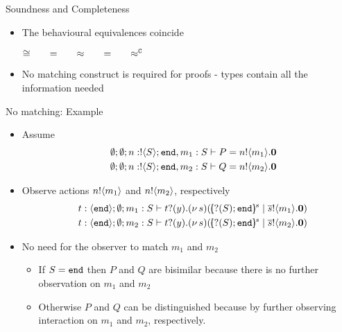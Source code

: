 \documentclass{beamer}
\begin{document}
	\begin{frame}{Soundness and Completeness}
		\begin{itemize}
			\item	The behavioural equivalences coincide

				\begin{theorem}
					\begin{center}
					$\cong \qquad =\qquad \approx \qquad =\qquad \approx^\mathtt{C}$
					\end{center}
				\end{theorem}

			\item	No matching construct is required for proofs - types contain all the information needed

		\end{itemize}
	\end{frame}

	\begin{frame}{No matching: Example}
			\begin{itemize}
				\item	Assume
					\begin{eqnarray*}
						&&\emptyset; \emptyset; n: ! \langle S \rangle ; \mathtt{end}, m_1 : S \vdash P = n ! \langle m_1 \rangle . \mathbf{0} \\
						&&\emptyset; \emptyset; n: ! \langle S \rangle ; \mathtt{end}, m_2 : S \vdash Q = n ! \langle m_2 \rangle . \mathbf{0}
					\end{eqnarray*}
				\item	Observe actions $n ! \langle m_1 \rangle$ and $n ! \langle m_2 \rangle$, respectively
					\begin{eqnarray*}
						&& t: \chtype{\tinact}; \es; m_1 : S \proves \binp{t}{y} \newsp{s}{\mapchar{\btinp{S} \tinact}{s}\Par \bout{\dual{s}}{m_1}\inact} \\
						&& t: \chtype{\tinact}; \es; m_2 : S \proves \binp{t}{y} \newsp{s}{\mapchar{\btinp{S} \tinact}{s}\Par \bout{\dual{s}}{m_2}\inact} 
					\end{eqnarray*}


				\item	No need for the observer to match $m_1$ and $m_2$
				\begin{itemize}
					\item	If $S = \mathtt{end}$ then $P$ and $Q$ are bisimilar because there is no further observation on $m_1$ and $m_2$
					\item	Otherwise $P$ and $Q$ can be distinguished because by further observing interaction on $m_1$ and $m_2$,
						respectively.
				\end{itemize}
			\end{itemize}
	\end{frame}
\end{document}
